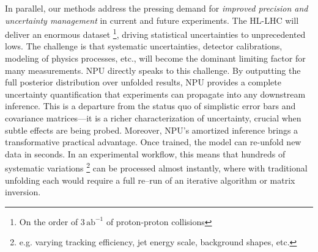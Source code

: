         In parallel, our methods address the pressing demand for \emph{improved precision and uncertainty management} in current and future experiments.
        The HL-LHC will deliver an enormous dataset \footnote{On the order of $3\,\text{ab}^{-1}$ of proton-proton collisions}, driving statistical uncertainties to unprecedented lows.
        The challenge is that systematic uncertainties, detector calibrations, modeling of physics processes, etc., will become the dominant limiting factor for many measurements.
        NPU directly speaks to this challenge.
        By outputting the full posterior distribution over unfolded results, NPU provides a complete uncertainty quantification that experiments can propagate into any downstream inference.
        This is a departure from the status quo of simplistic error bars and covariance matrices---it is a richer characterization of uncertainty, crucial when subtle effects are being probed.
        Moreover, NPU's amortized inference brings a transformative practical advantage.
        Once trained, the model can re-unfold new data in seconds.
        In an experimental workflow, this means that hundreds of systematic variations \footnote{e.g. varying tracking efficiency, jet energy scale, background shapes, etc.} can be processed almost instantly, where with traditional unfolding each would require a full re--run of an iterative algorithm or matrix inversion.
    
